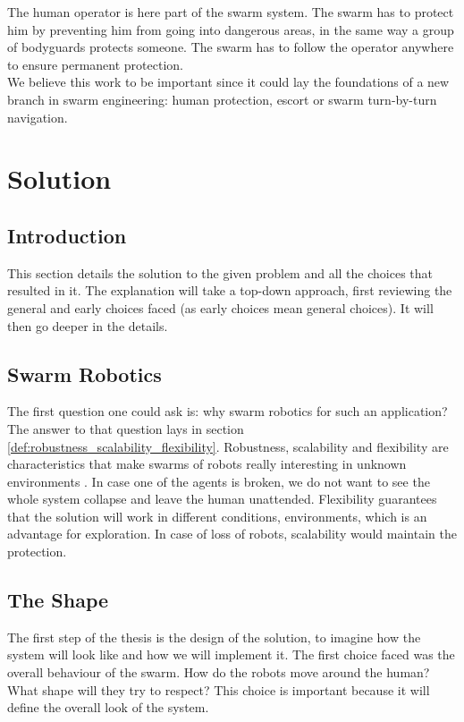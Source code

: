 \documentclass[a4paper, 12pt]{report}
\begin{document}
	The human operator is here part of the swarm system. The swarm has to protect him by preventing him from going into dangerous areas, in the same way a group of bodyguards protects someone. The swarm has to follow the operator anywhere to ensure permanent protection.\\
	
	We believe this work to be important since it could lay the foundations of a new branch in swarm engineering: human protection, escort or swarm turn-by-turn navigation.

\chapter{Solution}

	\section{Introduction}
	
	This section details the solution to the given problem and all the choices that resulted in it. The explanation will take a top-down approach, first reviewing the general and early choices faced (as early choices mean general choices). It will then go deeper in the details.
	
	\section{Swarm Robotics}
	
	The first question one could ask is: why swarm robotics for such an application? The answer to that question lays in section \ref{def:robustness_scalability_flexibility}. Robustness, scalability and flexibility are characteristics that make swarms of robots really interesting in unknown environments \citep{brambilla2013swarm}. In case one of the agents is broken, we do not want to see the whole system collapse and leave the human unattended. Flexibility guarantees that the solution will work in different conditions, environments, which is an advantage for exploration. In case of loss of robots, scalability would maintain the protection.
	
	\section{The Shape}
	
	The first step of the thesis is the design of the solution, to imagine how the system will look like and how we will implement it. The first choice faced was the overall behaviour of the swarm. How do the robots move around the human? What shape will they try to respect? This choice is important because it will define the overall look of the system.\\
	
\end{document}
